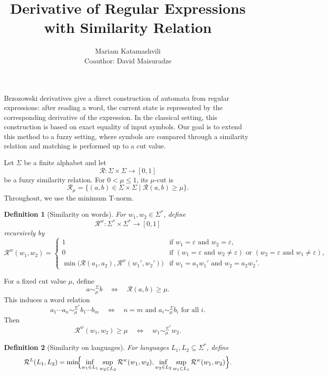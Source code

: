 \documentclass{easychair}
\title{Derivative of Regular Expressions with Similarity Relation}
\author{
Mariam Katamashvili\\[4pt]
\normalsize Coauthor: David Maisuradze
}
\institute{}
\newtheorem{definition}{Definition}
\begin{document}
\maketitle

Brzozowski derivatives give a direct construction of automata from regular
expressions: after reading a word, the current state is represented by the
corresponding derivative of the expression. In the classical setting, this
construction is based on exact equality of input symbols. Our goal is to extend
this method to a fuzzy setting, where symbols are compared through a similarity
relation and matching is performed up to a cut value.

Let $\Sigma$ be a finite alphabet and let
\[
\mathcal R:\Sigma\times\Sigma\to[0,1]
\]
be a fuzzy similarity relation. For $0<\mu\le1$, its $\mu$-cut is
\[
\mathcal R_\mu
=
\{(a,b)\in\Sigma\times\Sigma\mid \mathcal R(a,b)\ge\mu\}.
\]
Throughout, we use the minimum T-norm.


\begin{definition}[Similarity on words]
For $w_1,w_2\in\Sigma^\ast$, define
\[
\mathcal R^w:\Sigma^\ast\times\Sigma^\ast\to[0,1]
\]
recursively by
\[
\mathcal R^w(w_1,w_2)=
\begin{cases}
1 & \text{if } w_1=\varepsilon \text{ and } w_2=\varepsilon,\\[2pt]
0 & \text{if } (w_1=\varepsilon \text{ and } w_2\neq\varepsilon)
      \text{ or } (w_2=\varepsilon \text{ and } w_1\neq\varepsilon),\\[4pt]
\min\!\bigl(\mathcal R(a_1,a_2),\mathcal R^w(w_1',w_2')\bigr)
& \text{if } w_1=a_1w_1' \text{ and } w_2=a_2w_2'.
\end{cases}
\]
\end{definition}

For a fixed cut value $\mu$, define
\[
a\sim_\mu^\Sigma b
\quad\Longleftrightarrow\quad
\mathcal R(a,b)\ge\mu.
\]
This induces a word relation
\[
a_1\cdots a_n\sim_\mu^{\Sigma^\ast}b_1\cdots b_m
\quad\Longleftrightarrow\quad
n=m \text{ and } a_i\sim_\mu^\Sigma b_i
\text{ for all }i.
\]
Then
\[
\mathcal R^w(w_1,w_2)\ge\mu
\quad\Longleftrightarrow\quad
w_1\sim_\mu^{\Sigma^\ast}w_2.
\]

\begin{definition}[Similarity on languages]
For languages $L_1,L_2\subseteq\Sigma^\ast$, define
\[
\mathcal R^L(L_1,L_2)
=
\min\!\Bigl\{
\inf_{w_1\in L_1}\sup_{w_2\in L_2}\mathcal R^w(w_1,w_2),
\inf_{w_2\in L_2}\sup_{w_1\in L_1}\mathcal R^w(w_1,w_2)
\Bigr\}.
\]
\end{definition}
\end{document}

